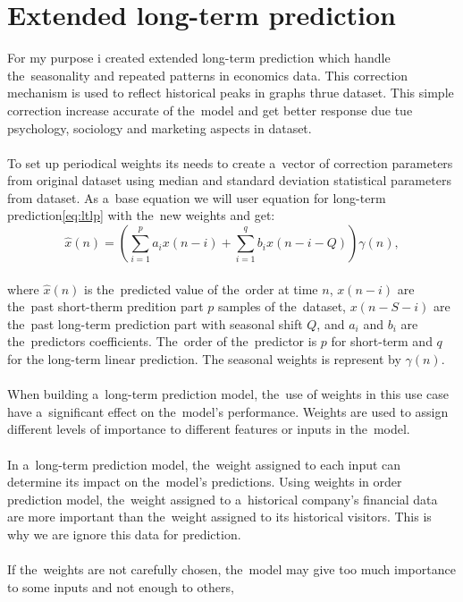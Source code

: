    \section{Extended long-term prediction}\label{sec:extlonglp}
    For my purpose i created extended long-term prediction which handle the~seasonality and repeated patterns
    in economics data. This correction mechanism is used to reflect historical peaks in graphs thrue dataset.
    This simple correction increase accurate of the~model and get better response due tue psychology,
    sociology and marketing aspects in dataset.\\
    \\
    To set up periodical weights its needs to create a~vector of correction parameters from original dataset using
    median and standard deviation statistical parameters from dataset. As a~base equation we will user equation
    for long-term prediction\ref{eq:ltlp} with the~new weights and get:
    \begin{equation} \label{eq:eltlp}
        \hat{x}(n) = \left(\sum_{i=1}^{p} a_i x(n-i) + \sum_{i=1}^{q} b_i x(n-i-Q)\right) \gamma(n),
    \end{equation}
    \\
    where $\hat{x}(n)$ is the~predicted value of the~order at time $n$, $x(n-i)$ are the~past short-therm predition part $p$ samples of the~dataset, $x(n-S-i)$ are the~past long-term prediction part with seasonal shift $Q$, and $a_i$ and $b_i$ are the~predictors coefficients. The~order of the~predictor is $p$ for short-term and $q$ for the long-term linear prediction. The seasonal weights is represent by $\gamma(n)$.\\
    \\
    When building a~long-term prediction model, the~use of weights in this use case have a~significant effect on
    the~model's performance. Weights are used to assign different levels of importance to different
    features or inputs in the~model.\\
    \\
    In a~long-term prediction model, the~weight assigned to each input can determine its impact on the~model's predictions.
    Using weights in order prediction model, the~weight assigned to a~historical company's financial data are more important
    than the~weight assigned to its historical visitors. This is why we are ignore this data for prediction.\\
    \\
    If the~weights are not carefully chosen, the~model may give too much importance to some inputs and not enough to others,
